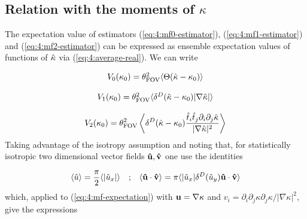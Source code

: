 \subsection{Relation with the moments of $\kappa$}
\label{sec:4:mink-mom}
The expectation value of estimators (\ref{eq:4:mf0-estimator}), (\ref{eq:4:mf1-estimator}) and (\ref{eq:4:mf2-estimator}) can be expressed as ensemble expectation values of functions of $\hat{\kappa}$ via (\ref{eq:4:average-real}). We can write

\begin{equation}
\label{eq:4:mf-expectation}
\begin{matrix}
V_0(\kappa_0) = \theta_{\rm FOV}^2\langle\Theta(\hat{\kappa}-\kappa_0)\rangle \\ \\
V_1(\kappa_0) = \theta_{\rm FOV}^2\langle\delta^D(\hat{\kappa}-\kappa_0)\vert\nabla\hat{\kappa}\vert\rangle \\ \\
\displaystyle V_2(\kappa_0) = \theta_{\rm FOV}^2\left\langle\delta^D(\hat{\kappa}-\kappa_0)\frac{\hat{t}_i\hat{t}_j\partial_i\partial_j\hat{\kappa}}{\vert\nabla\hat{\kappa}\vert^2}\right\rangle
\end{matrix}
\end{equation}
%
Taking advantage of the isotropy assumption and noting that, for statistically isotropic two dimensional vector fields $\mathbf{\hat{u}},\mathbf{\hat{v}}$ one use the identities

\begin{equation}
\label{eq:4:iso-vectors}
\begin{matrix}
\displaystyle \langle\hat{u}\rangle = \frac{\pi}{2}\langle\vert\hat{u}_x\vert\rangle & ; & \displaystyle \langle\mathbf{\hat{u}}\cdot\mathbf{\hat{v}}\rangle = \pi\langle\vert \hat{u}_x\vert\delta^D (\hat{u}_y)\mathbf{\hat{u}}\cdot\mathbf{\hat{v}}\rangle
\end{matrix}
\end{equation}
%
which, applied to (\ref{eq:4:mf-expectation}) with $\mathbf{u}=\nabla\kappa$ and $v_i=\partial_i\partial_j\kappa\partial_j\kappa/\vert\nabla\kappa\vert^2$, give the expressions

